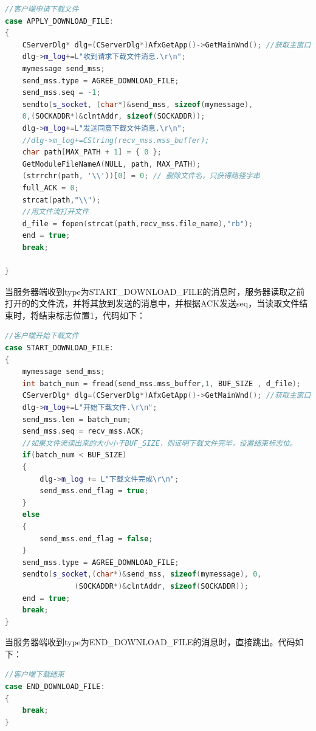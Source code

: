 \begin{flushleft}
\begin{lstlisting}[language={C++},basicstyle=\footnotesize]
//客户端申请下载文件
case APPLY_DOWNLOAD_FILE:
{
	CServerDlg* dlg=(CServerDlg*)AfxGetApp()->GetMainWnd(); //获取主窗口
	dlg->m_log+=L"收到请求下载文件消息.\r\n";
	mymessage send_mss;
	send_mss.type = AGREE_DOWNLOAD_FILE;
	send_mss.seq = -1;
	sendto(s_socket, (char*)&send_mss, sizeof(mymessage), 
    0,(SOCKADDR*)&clntAddr, sizeof(SOCKADDR));
	dlg->m_log+=L"发送同意下载文件消息.\r\n";
	//dlg->m_log+=CString(recv_mss.mss_buffer);
	char path[MAX_PATH + 1] = { 0 };
	GetModuleFileNameA(NULL, path, MAX_PATH);
	(strrchr(path, '\\'))[0] = 0; // 删除文件名，只获得路径字串
	full_ACK = 0;
	strcat(path,"\\");
	//用文件流打开文件
	d_file = fopen(strcat(path,recv_mss.file_name),"rb");
	end = true;
	break;

}
\end{lstlisting}
\end{flushleft}


当服务器端收到type为START\_DOWNLOAD\_FILE的消息时，服务器读取之前打开的的文件流，并将其放到发送的消息中，并根据ACK发送seq，当读取文件结束时，将结束标志位置1，代码如下：

\begin{flushleft}
\begin{lstlisting}[language={C++},basicstyle=\footnotesize]
//客户端开始下载文件
case START_DOWNLOAD_FILE:
{
	mymessage send_mss;
	int batch_num = fread(send_mss.mss_buffer,1, BUF_SIZE , d_file);
	CServerDlg* dlg=(CServerDlg*)AfxGetApp()->GetMainWnd(); //获取主窗口
	dlg->m_log+=L"开始下载文件.\r\n";
	send_mss.len = batch_num;
	send_mss.seq = recv_mss.ACK;
	//如果文件流读出来的大小小于BUF_SIZE，则证明下载文件完毕，设置结束标志位。
	if(batch_num < BUF_SIZE)
	{
		dlg->m_log += L"下载文件完成\r\n";
		send_mss.end_flag = true;
	}
	else
	{
		send_mss.end_flag = false;
	}
	send_mss.type = AGREE_DOWNLOAD_FILE;
	sendto(s_socket,(char*)&send_mss, sizeof(mymessage), 0,
				(SOCKADDR*)&clntAddr, sizeof(SOCKADDR));
	end = true;
	break;
}
\end{lstlisting}
\end{flushleft}

当服务器端收到type为END\_DOWNLOAD\_FILE的消息时，直接跳出。代码如下：

\begin{flushleft}
\begin{lstlisting}[language={C++},basicstyle=\footnotesize]
//客户端下载结束
case END_DOWNLOAD_FILE:
{
	break;
}
\end{lstlisting}
\end{flushleft}


